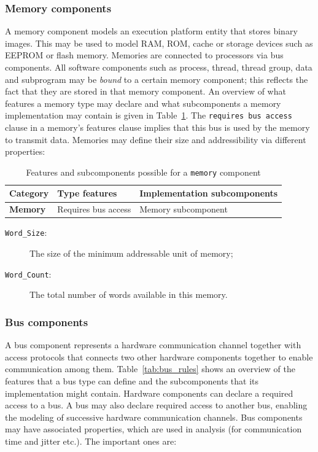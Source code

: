 \subsubsection{Memory components}
A memory component models an execution platform entity that stores
binary images. This may be used to model RAM, ROM, cache or storage
devices such as EEPROM or flash memory. Memories are connected to
processors via bus components. All software components such as
process, thread, thread group, data and subprogram may be \emph{bound}
to a certain memory component; this reflects the fact that they are
stored in that memory component. An overview of what features a memory
type may declare and what subcomponents a memory implementation may
contain is given in Table~\ref{tab:mem_rules}. The \texttt{requires
  bus access} clause in a memory's features clause implies that this
bus is used by the memory to transmit data. Memories may define their
size and addressibility via different properties:

\begin{table}
\centering
\begin{tabular}{|l|l|l|}
\hline
\textbf{Category} & \textbf{Type features} & \textbf{Implementation
  subcomponents} \\
\hline
\textbf{Memory} & Requires bus access & Memory subcomponent\\
\hline
\end{tabular}
\caption{Features and subcomponents possible for a \texttt{memory}
  component}
\label{tab:mem_rules}
\end{table}

\begin{description}
\item[\texttt{Word\_Size}:]{The size of the minimum addressable unit
  of memory;}
\item[\texttt{Word\_Count}:]{The total number of words available in
  this memory.}
\end{description}

\subsubsection{Bus components}
A bus component represents a hardware communication channel together
with access protocols that connects two other hardware components
together to enable communication among them. Table~\ref{tab:bus_rules}
shows an overview of the features that a bus type can define and the
subcomponents that its implementation might contain. Hardware
components can declare a required access to a bus. A bus may also
declare required access to another bus, enabling the modeling of
successive hardware communication channels. Bus components may have
associated properties, which are used in analysis (for communication
time and jitter etc.). The important ones are:


